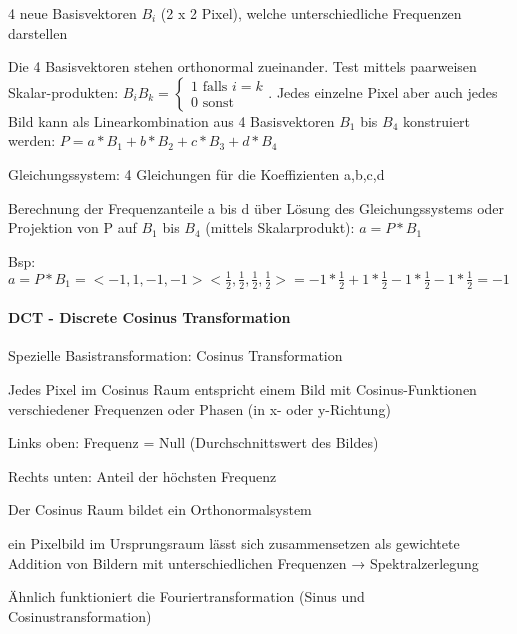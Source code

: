 \documentclass[landscape]{article}
\begin{document}
\begin{multicols}{3}
  
  4 neue Basisvektoren $B_i$ (2 x 2 Pixel), welche unterschiedliche Frequenzen darstellen
  
  
  Die 4 Basisvektoren stehen orthonormal zueinander. Test mittels paarweisen Skalar-produkten: $B_iB_k=\begin{cases}1 \text{ falls } i=k\\ 0 \text{ sonst }\end{cases}$.
  Jedes einzelne Pixel aber auch jedes Bild kann als Linearkombination aus 4 Basisvektoren $B_1$ bis $B_4$ konstruiert werden: $P=a*B_1+b*B_2+c*B_3+d*B_4$
  \begin{itemize*}
    \item Gleichungssystem: 4 Gleichungen für die Koeffizienten a,b,c,d
    \item Berechnung der Frequenzanteile a bis d über Lösung des Gleichungssystems oder Projektion von P auf $B_1$ bis $B_4$ (mittels Skalarprodukt): $a=P*B_1$
  \end{itemize*}
  
  Bsp: $a=P*B_1 = <-1, 1, -1, -1><\frac{1}{2}, \frac{1}{2}, \frac{1}{2}, \frac{1}{2}> = -1*\frac{1}{2}+1*\frac{1}{2}-1*\frac{1}{2}-1*\frac{1}{2} = -1$
  
  
  \paragraph{DCT - Discrete Cosinus Transformation}
  \begin{itemize*}
    \item Spezielle Basistransformation: Cosinus Transformation
    \item Jedes Pixel im Cosinus Raum entspricht einem Bild mit Cosinus-Funktionen verschiedener Frequenzen oder Phasen (in x- oder y-Richtung)
          \begin{itemize*}
            \item Links oben: Frequenz = Null (Durchschnittswert des Bildes)
            \item Rechts unten: Anteil der höchsten Frequenz
          \end{itemize*}
    \item Der Cosinus Raum bildet ein Orthonormalsystem
    \item ein Pixelbild im Ursprungsraum lässt sich zusammensetzen als gewichtete Addition von Bildern mit unterschiedlichen Frequenzen → Spektralzerlegung
    \item Ähnlich funktioniert die Fouriertransformation (Sinus und Cosinustransformation)
  \end{itemize*}
  

\end{multicols}
\end{document}
